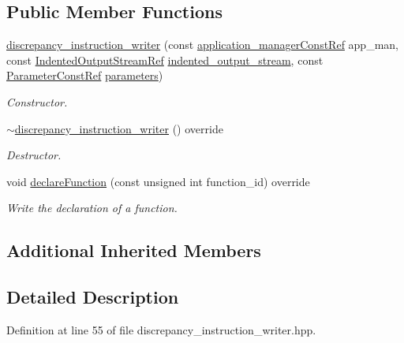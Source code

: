 \subsection*{Public Member Functions}
\begin{DoxyCompactItemize}
\item 
\hyperlink{classdiscrepancy__instruction__writer_a563703e6577efd4a025851d7e1f71476}{discrepancy\+\_\+instruction\+\_\+writer} (const \hyperlink{application__manager_8hpp_abb985163a2a3fb747f6f03b1eaadbb44}{application\+\_\+manager\+Const\+Ref} app\+\_\+man, const \hyperlink{indented__output__stream_8hpp_ab32278e11151ef292759c88e99b77feb}{Indented\+Output\+Stream\+Ref} \hyperlink{classInstructionWriter_a8d06403d2bdb8f66559e2d4c2f1f1b48}{indented\+\_\+output\+\_\+stream}, const \hyperlink{Parameter_8hpp_a37841774a6fcb479b597fdf8955eb4ea}{Parameter\+Const\+Ref} \hyperlink{classInstructionWriter_a331d7d35c5526ead7951c74f4ecbe667}{parameters})
\begin{DoxyCompactList}\small\item\em Constructor. \end{DoxyCompactList}\item 
\hyperlink{classdiscrepancy__instruction__writer_ac52aa598fff74d0eb54c21ce8a2aa6ca}{$\sim$discrepancy\+\_\+instruction\+\_\+writer} () override
\begin{DoxyCompactList}\small\item\em Destructor. \end{DoxyCompactList}\item 
void \hyperlink{classdiscrepancy__instruction__writer_a7cdc4c4bb3fd4ce16b91ca818271d2b8}{declare\+Function} (const unsigned int function\+\_\+id) override
\begin{DoxyCompactList}\small\item\em Write the declaration of a function. \end{DoxyCompactList}\end{DoxyCompactItemize}
\subsection*{Additional Inherited Members}


\subsection{Detailed Description}


Definition at line 55 of file discrepancy\+\_\+instruction\+\_\+writer.\+hpp.



